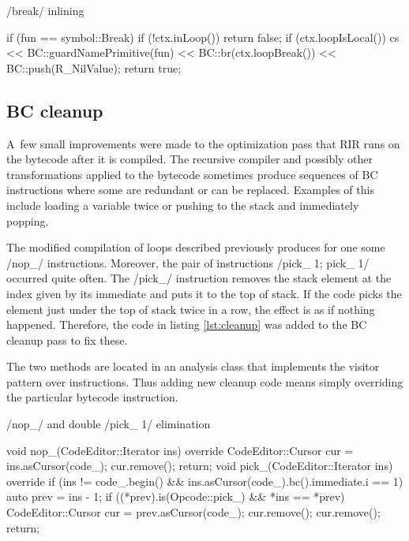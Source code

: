 \begin{listing}[htbp]
  \caption{\label{lst:break}\rinline/break/ inlining}
  \begin{cppcode}
if (fun == symbol::Break) {
    if (!ctx.inLoop()) return false;
    if (ctx.loopIsLocal()) {
        cs << BC::guardNamePrimitive(fun)
           << BC::br(ctx.loopBreak())
           << BC::push(R_NilValue);
        return true;
    }
}
  \end{cppcode}
\end{listing}


\subsection{BC cleanup}

A~few small improvements were made to the optimization pass that RIR runs on the bytecode after it is compiled. The recursive compiler and possibly other transformations applied to the bytecode sometimes produce sequences of BC instructions where some are redundant or can be replaced. Examples of this include loading a variable twice or pushing to the stack and immediately popping.

The modified compilation of loops described previously produces for one some \cinline/nop_/ instructions. Moreover, the pair of instructions \cinline/pick_ 1; pick_ 1/ occurred quite often. The \cinline/pick_/ instruction removes the stack element at the index given by its immediate and puts it to the top of stack. If the code picks the element just under the top of stack twice in a row, the effect is as if nothing happened. Therefore, the code in listing \ref{lst:cleanup} was added to the BC cleanup pass to fix these.

The two methods are located in an analysis class that implements the visitor pattern over instructions. Thus adding new cleanup code means simply overriding the particular bytecode instruction.

\begin{listing}[htbp]
  \caption{\label{lst:cleanup}\cinline/nop_/ and double \cinline/pick_ 1/ elimination}
  \begin{cppcode}
void nop_(CodeEditor::Iterator ins) override {
    CodeEditor::Cursor cur = ins.asCursor(code_);
    cur.remove();
    return;
}
void pick_(CodeEditor::Iterator ins) override {
    if (ins != code_.begin() &&
        ins.asCursor(code_).bc().immediate.i == 1) {
        auto prev = ins - 1;
        if ((*prev).is(Opcode::pick_) && *ins == *prev) {
            CodeEditor::Cursor cur = prev.asCursor(code_);
            cur.remove();
            cur.remove();
            return;
        }
    }
}
  \end{cppcode}
\end{listing}

